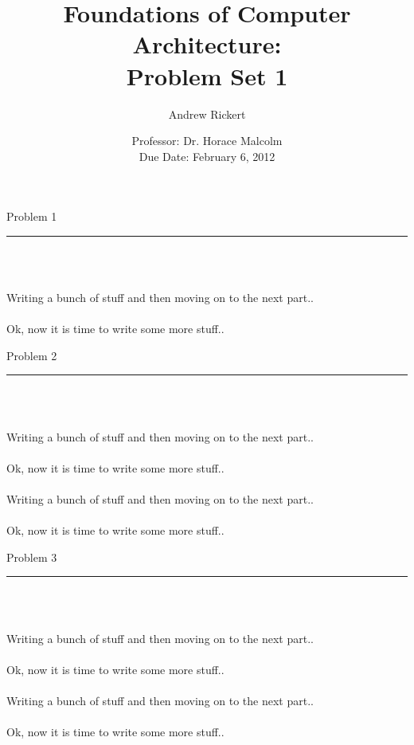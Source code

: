 \documentclass[11pt,reqno]{article}
\title{Foundations of Computer Architecture: \\ Problem Set 1 }
\author{Andrew Rickert}
\date{Professor: Dr. Horace Malcolm \\ \hspace{-25pt} Due Date: February 6,  2012}                                           %
\begin{document}
\maketitle


\begin{flushleft} 
Problem 1 \\
\rule{500pt}{1pt}\\
\end{flushleft} 
\\ 

Writing a bunch of stuff and then moving on to the next part..\\

\noindent{}\\ 

Ok, now it is time to write some more stuff.. \\
 
\begin{flushleft} 
Problem 2 \\
\rule{500pt}{1pt}\\
\end{flushleft} 
\\ 

Writing a bunch of stuff and then moving on to the next part..\\

\noindent {}\\ 

Ok, now it is time to write some more stuff.. \\

\noindent {}\\ 

Writing a bunch of stuff and then moving on to the next part..\\

\noindent {}\\ 

Ok, now it is time to write some more stuff.. \\


\begin{flushleft} 
Problem 3 \\
\rule{500pt}{1pt}\\
\end{flushleft} 
\\ 

Writing a bunch of stuff and then moving on to the next part..\\

\noindent{}\\ 

Ok, now it is time to write some more stuff.. \\

\noindent {}\\ 

Writing a bunch of stuff and then moving on to the next part..\\

\noindent {}\\ 

Ok, now it is time to write some more stuff.. \\
\end{document}
